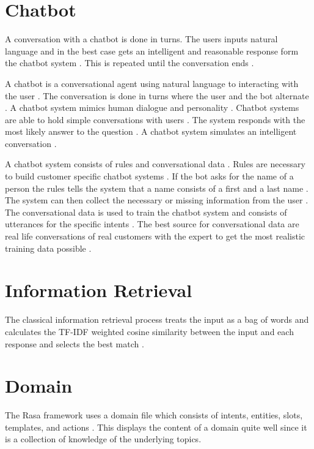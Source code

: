 \documentclass[12pt, backref]{report}
\begin{document}
\section{Chatbot}
A conversation with a chatbot is done in turns. The users inputs natural language and in the best case gets an intelligent and reasonable response form the chatbot system \cite{vrajitoru2004evolutionary}. This is repeated until the conversation ends \cite{vrajitoru2004evolutionary}.


A chatbot is a conversational agent using natural language to interacting with the user \cite{evaluateChatbotsShawar2007, shawar2007chatbots, extractingHuang2007, gregori2017evaluation}.
The conversation is done in turns where the user and the bot alternate \cite{evaluateChatbotsShawar2007, shawar2007chatbots}.
A chatbot system mimics human dialogue and personality \cite{kane2016role, dutta2017developing}.
Chatbot systems are able to hold simple conversations with users \cite{kane2016role}.
The system responds with the most likely answer to the question \cite{dutta2017developing}.
A chatbot system simulates an intelligent conversation \cite{vrajitoru2004evolutionary}.


A chatbot system consists of rules and conversational data \cite{singhbuilding}.
Rules are necessary to build customer specific chatbot systems \cite{singhbuilding}. 
If the bot asks for the name of a person the rules tells the system that a name consists of a first and a last name \cite{singhbuilding}. The system can then collect the necessary or missing information from the user \cite{singhbuilding}.
The conversational data is used to train the chatbot system and consists of utterances for the specific intents \cite{singhbuilding}.
The best source for conversational data are real life conversations of real customers with the expert to get the most realistic training data possible \cite{singhbuilding}.

\section{Information Retrieval}
The classical information retrieval process treats the input as a bag of words and calculates the TF-IDF weighted cosine similarity between the input and each response and selects the best match \cite{bordes2016learning}.

\section{Domain}
The Rasa framework uses a domain file which consists of intents, entities, slots, templates, and actions \cite{buiildChatbotsPython}.
This displays the content of a domain quite well since it is a collection of knowledge of the underlying topics.
\end{document}

